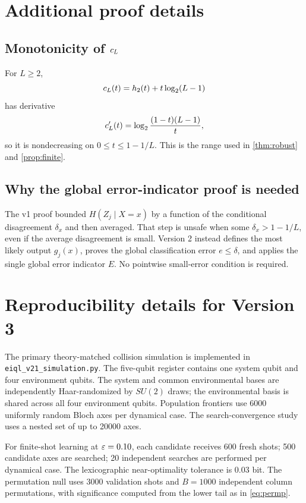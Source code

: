 \appendix

\section{Additional proof details}

\subsection{Monotonicity of $c_L$}
For $L\ge2$,
\[
c_L(t)=h_2(t)+t\log_2(L-1)
\]
has derivative
\[
c_L'(t)=\log_2\frac{(1-t)(L-1)}{t},
\]
so it is nondecreasing on $0\le t\le1-1/L$. This is the range used in \cref{thm:robust} and \cref{prop:finite}.

\subsection{Why the global error-indicator proof is needed}
The v1 proof bounded $H(Z_j\mid X=x)$ by a function of the conditional disagreement $\delta_x$ and then averaged. That step is unsafe when some $\delta_x>1-1/L$, even if the average disagreement is small. Version 2 instead defines the most likely output $g_j(x)$, proves the global classification error $e\le\delta$, and applies the single global error indicator $E$. No pointwise small-error condition is required.

\section{Reproducibility details for Version 3}

The primary theory-matched collision simulation is implemented in \texttt{eiql\_v21\_simulation.py}. The five-qubit register contains one system qubit and four environment qubits. The system and common environmental bases are independently Haar-randomized by $SU(2)$ draws; the environmental basis is shared across all four environment qubits. Population frontiers use 6000 uniformly random Bloch axes per dynamical case. The search-convergence study uses a nested set of up to 20000 axes.

For finite-shot learning at $\varepsilon=0.10$, each candidate receives 600 fresh shots; 500 candidate axes are searched; 20 independent searches are performed per dynamical case. The lexicographic near-optimality tolerance is $0.03$ bit. The permutation null uses 3000 validation shots and $B=1000$ independent column permutations, with significance computed from the lower tail as in \cref{eq:permp}.

